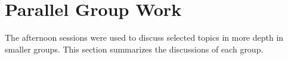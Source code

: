 \section{Parallel Group Work}\label{sec:parallel-group-work}

The afternoon sessions were used to discuss selected topics in more depth in
smaller groups. This section summarizes the discussions of each group.

